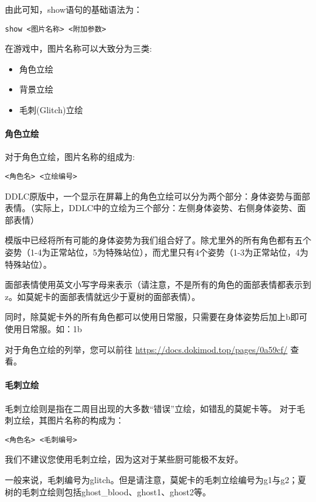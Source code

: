 由此可知，show语句的基础语法为：
\begin{lstlisting}[numbers=none]
show <图片名称> <附加参数>
\end{lstlisting}

在游戏中，图片名称可以大致分为三类:
\begin{itemize}
    \item 角色立绘
    \item 背景立绘
    \item 毛刺(Glitch)立绘
\end{itemize}

\paragraph{角色立绘}\label{para:3.2.2.1}

对于角色立绘，图片名称的组成为:
\begin{lstlisting}[numbers=none]
<角色名> <立绘编号>
\end{lstlisting}

DDLC原版中，一个显示在屏幕上的角色立绘可以分为两个部分：身体姿势与面部表情。（实际上，DDLC中的立绘为三个部分：左侧身体姿势、右侧身体姿势、面部表情）

模版中已经将所有可能的身体姿势为我们组合好了。除尤里外的所有角色都有五个姿势（1-4为正常站位，5为特殊站位），而尤里只有4个姿势（1-3为正常站位，4为特殊站位）。

面部表情使用英文小写字母来表示（请注意，不是所有的角色的面部表情都表示到z。如莫妮卡的面部表情就远少于夏树的面部表情）。

同时，除莫妮卡外的所有角色都可以使用日常服，只需要在身体姿势后加上b即可使用日常服。如：1b

对于角色立绘的列举，您可以前往 \url{https://docs.dokimod.top/pages/0a59cf/} 查看。

\paragraph{毛刺立绘}

毛刺立绘则是指在二周目出现的大多数“错误”立绘，如错乱的莫妮卡等。
对于毛刺立绘，其图片名称的构成为：
\begin{lstlisting}[numbers=none]
<角色名> <毛刺编号>
\end{lstlisting}

\begin{Warning}
    我们不建议您使用毛刺立绘，因为这对于某些厨可能极不友好。
\end{Warning}

一般来说，毛刺编号为glitch。但是请注意，莫妮卡的毛刺立绘编号为g1与g2；夏树的毛刺立绘则包括ghost\_blood、ghost1、ghost2等。

